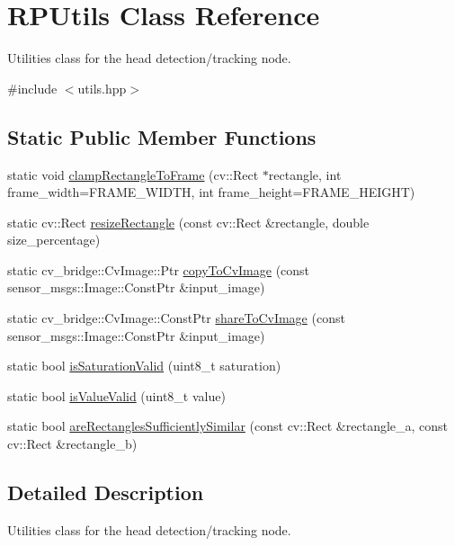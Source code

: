 \hypertarget{class_r_p_utils}{\section{\-R\-P\-Utils \-Class \-Reference}
\label{class_r_p_utils}
}


\-Utilities class for the head detection/tracking node.  




{\ttfamily \#include $<$utils.\-hpp$>$}

\subsection*{\-Static \-Public \-Member \-Functions}
\begin{DoxyCompactItemize}
\item 
static void \hyperlink{class_r_p_utils_a52741e3f17e2c17e977a1c10bae7ab49}{clamp\-Rectangle\-To\-Frame} (cv\-::\-Rect $\ast$rectangle, int frame\-\_\-width=\-F\-R\-A\-M\-E\-\_\-\-W\-I\-D\-T\-H, int frame\-\_\-height=\-F\-R\-A\-M\-E\-\_\-\-H\-E\-I\-G\-H\-T)
\item 
static cv\-::\-Rect \hyperlink{class_r_p_utils_a17ce7f5087717dc24f806310a631da2a}{resize\-Rectangle} (const cv\-::\-Rect \&rectangle, double size\-\_\-percentage)
\item 
static cv\-\_\-bridge\-::\-Cv\-Image\-::\-Ptr \hyperlink{class_r_p_utils_ae77cfd01ffcc5c89313213200b6bcc70}{copy\-To\-Cv\-Image} (const sensor\-\_\-msgs\-::\-Image\-::\-Const\-Ptr \&input\-\_\-image)
\item 
static cv\-\_\-bridge\-::\-Cv\-Image\-::\-Const\-Ptr \hyperlink{class_r_p_utils_a71ea94854fb0d231180f1e8e72dd64f6}{share\-To\-Cv\-Image} (const sensor\-\_\-msgs\-::\-Image\-::\-Const\-Ptr \&input\-\_\-image)
\item 
static bool \hyperlink{class_r_p_utils_a1f952e73e6d874d74b0dd8bae8d219c4}{is\-Saturation\-Valid} (uint8\-\_\-t saturation)
\item 
static bool \hyperlink{class_r_p_utils_afc479087500282c2b8bbe0c5f4b28a2b}{is\-Value\-Valid} (uint8\-\_\-t value)
\item 
static bool \hyperlink{class_r_p_utils_abc5aaf099873b93b2f23ca55a362a28c}{are\-Rectangles\-Sufficiently\-Similar} (const cv\-::\-Rect \&rectangle\-\_\-a, const cv\-::\-Rect \&rectangle\-\_\-b)
\end{DoxyCompactItemize}


\subsection{\-Detailed \-Description}
\-Utilities class for the head detection/tracking node. 

